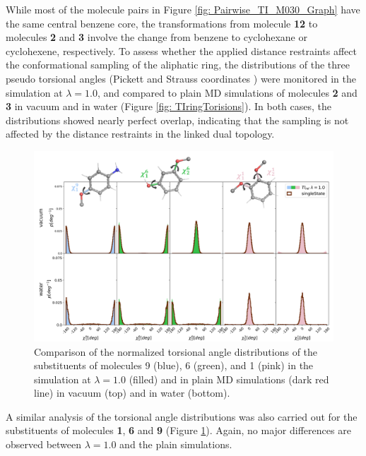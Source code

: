 While most of the molecule pairs in Figure \ref{fig: Pairwise_TI_M030_Graph} have the same central benzene core, the transformations from molecule \textbf{12} to molecules \textbf{2} and \textbf{3} involve the change from benzene to cyclohexane or cyclohexene, respectively. To assess whether the applied distance restraints affect the conformational sampling of the aliphatic ring, the distributions of the three pseudo torsional angles (Pickett and Strauss coordinates \cite{Strauss1970}) were monitored in the simulation at $\lambda=1.0$, and compared to plain MD simulations of molecules \textbf{2} and \textbf{3} in vacuum and in water (Figure \ref{fig: TIringTorisions}).
In both cases, the distributions showed nearly perfect overlap, indicating that the sampling is not affected by the distance restraints in the linked dual topology.

\begin{figure}[h!]
    \centering
    \includegraphics[width=\textwidth]{fig/results/pairwise/sampling/torsions/TI_all_substorsion_ana_partnerM030_singleState_populations_total.png}
    \caption{Comparison of the normalized torsional angle distributions of the substituents of molecules 9 (blue), 6 (green), and 1 (pink) in the simulation at $\lambda=1.0$ (filled) and in plain MD simulations (dark red line) in vacuum (top) and in water (bottom).}
    \label{SIfig: TIsubsTorisions}
\end{figure}
A similar analysis of the torsional angle distributions was also carried out for the substituents of molecules \textbf{1}, \textbf{6} and \textbf{9} (Figure \ref{SIfig: TIsubsTorisions}). Again, no major differences are observed between $\lambda=1.0$ and the plain simulations. 




